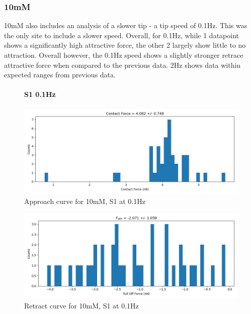 \subsubsection*{10mM}
10mM also includes an analysis of a slower tip - a tip speed of 0.1Hz. This was the only site to include a slower speed. Overall, for 0.1Hz, while 1 datapoint shows a significantly high attractive force, the other 2 largely show little to no attraction. Overall however, the 0.1Hz speed shows a slightly stronger retrace attractive force when compared to the previous data. 2Hz shows data within expected ranges from previous data.
\begin{figure}[h!]
\paragraph{S1 0.1Hz}
\centering
\includegraphics[width=\textwidth]{chapter7/Tip speed/10mM/S1 0.1Hz/approach_f_c_hist.jpg}
\caption{Approach curve for 10mM, S1 at 0.1Hz}
\end{figure}

\begin{figure}[h!]
\centering
\includegraphics[width=\textwidth]{chapter7/Tip speed/10mM/S1 0.1Hz/retract_f_a_hist.jpg}
\caption{Retract curve for 10mM, S1 at 0.1Hz}
\end{figure}
\newpage

